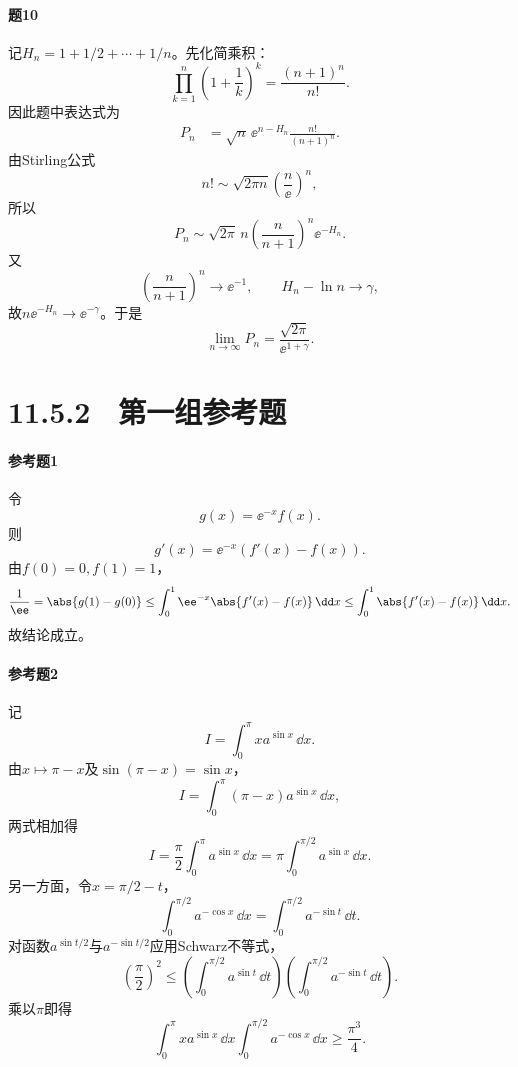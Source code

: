 \paragraph{题10}
\begin{xsolution}
记$H_n=1+1/2+\cdots+1/n$。先化简乘积：
\[
 \prod_{k=1}^n\left(1+\frac1k\right)^k
 =\frac{(n+1)^n}{n!}.
\]
因此题中表达式为
\begin{align*}
P_n
&=\sqrt n\,\ee^{n-H_n}\frac{n!}{(n+1)^n}.
\end{align*}
由Stirling公式
\[
 n!\sim\sqrt{2\pi n}\left(\frac n\ee\right)^n,
\]
所以
\[
 P_n\sim\sqrt{2\pi}\,n
 \left(\frac n{n+1}\right)^n\ee^{-H_n}.
\]
又
\[
 \left(\frac n{n+1}\right)^n\to\ee^{-1},
 \qquad H_n-\ln n\to\gamma,
\]
故$n\ee^{-H_n}\to\ee^{-\gamma}$。于是
\[
 \boxed{\lim_{n\to\infty}P_n
 =\frac{\sqrt{2\pi}}{\ee^{1+\gamma}}}.
\]
\end{xsolution}

\section*{11.5.2　第一组参考题}

\paragraph{参考题1}
\begin{xsolution}
令
\[
 g(x)=\ee^{-x}f(x).
\]
则
\[
 g'(x)=\ee^{-x}(f'(x)-f(x)).
\]
由$f(0)=0,f(1)=1$，
\[
 \frac1\ee=\abs{g(1)-g(0)}
 \le\int_0^1\ee^{-x}\abs{f'(x)-f(x)}\,\dd x
 \le\int_0^1\abs{f'(x)-f(x)}\,\dd x.
\]
故结论成立。
\end{xsolution}

\paragraph{参考题2}
\begin{xsolution}
记
\[
 I=\int_0^\pi xa^{\sin x}\,\dd x.
\]
由$x\mapsto\pi-x$及$\sin(\pi-x)=\sin x$，
\[
 I=\int_0^\pi(\pi-x)a^{\sin x}\,\dd x,
\]
两式相加得
\[
 I=\frac\pi2\int_0^\pi a^{\sin x}\,\dd x
 =\pi\int_0^{\pi/2}a^{\sin x}\,\dd x.
\]
另一方面，令$x=\pi/2-t$，
\[
 \int_0^{\pi/2}a^{-\cos x}\,\dd x
 =\int_0^{\pi/2}a^{-\sin t}\,\dd t.
\]
对函数$a^{\sin t/2}$与$a^{-\sin t/2}$应用Schwarz不等式，
\[
 \left(\frac\pi2\right)^2
 \le\left(\int_0^{\pi/2}a^{\sin t}\,\dd t\right)
 \left(\int_0^{\pi/2}a^{-\sin t}\,\dd t\right).
\]
乘以$\pi$即得
\[
 \int_0^\pi xa^{\sin x}\,\dd x
 \int_0^{\pi/2}a^{-\cos x}\,\dd x
 \ge\frac{\pi^3}{4}.
\]
\end{xsolution}

